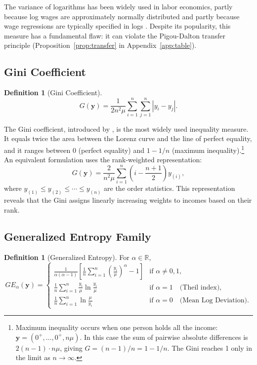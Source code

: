 \documentclass[12pt]{article}
\theoremstyle{plain}
\theoremstyle{definition}
\newtheorem{definition}[theorem]{Definition}
\theoremstyle{remark}
\newcommand{\R}{\mathbb{R}}
\newcommand{\bfy}{\mathbf{y}}
\begin{document}
The variance of logarithms has been widely used in labor economics, partly because log wages are approximately normally distributed and partly because wage regressions are typically specified in logs \citep{Juhn1993}.
Despite its popularity, this measure has a fundamental flaw: it can violate the Pigou-Dalton transfer principle (Proposition~\ref{prop:transfer} in Appendix~\ref{app:table}).

\subsection{Gini Coefficient}\label{sec:gini}

\begin{definition}[Gini Coefficient]
\begin{equation}\label{eq:gini}
G(\bfy) = \frac{1}{2n^2 \mu} \sum_{i=1}^n \sum_{j=1}^n |y_i - y_j|.
\end{equation}
\end{definition}

The Gini coefficient, introduced by \citet{Gini1912}, is the most widely used inequality measure.
It equals twice the area between the Lorenz curve and the line of perfect equality, and it ranges between 0 (perfect equality) and $1 - 1/n$ (maximum inequality).\footnote{Maximum inequality occurs when one person holds all the income: $\bfy = (0^+, \ldots, 0^+, n\mu)$. In this case the sum of pairwise absolute differences is $2(n-1) \cdot n\mu$, giving $G = (n-1)/n = 1 - 1/n$. The Gini reaches 1 only in the limit as $n \to \infty$.}
An equivalent formulation uses the rank-weighted representation:
\begin{equation}\label{eq:gini_rank}
G(\bfy) = \frac{2}{n^2 \mu} \sum_{i=1}^n \left(i - \frac{n+1}{2}\right) y_{(i)},
\end{equation}
where $y_{(1)} \leq y_{(2)} \leq \cdots \leq y_{(n)}$ are the order statistics.
This representation reveals that the Gini assigns linearly increasing weights to incomes based on their rank.

\subsection{Generalized Entropy Family}\label{sec:ge}

\begin{definition}[Generalized Entropy]
For $\alpha \in \R$,
\begin{equation}\label{eq:ge}
GE_\alpha(\bfy) = \begin{cases}
\displaystyle\frac{1}{\alpha(\alpha - 1)}\left[\frac{1}{n}\sum_{i=1}^n \left(\frac{y_i}{\mu}\right)^\alpha - 1\right] & \text{if } \alpha \neq 0, 1, \\[1.5em]
\displaystyle\frac{1}{n}\sum_{i=1}^n \frac{y_i}{\mu} \ln \frac{y_i}{\mu} & \text{if } \alpha = 1 \quad \text{(Theil index)}, \\[1.5em]
\displaystyle\frac{1}{n}\sum_{i=1}^n \ln \frac{\mu}{y_i} & \text{if } \alpha = 0 \quad \text{(Mean Log Deviation)}.
\end{cases}
\end{equation}
\end{definition}
\end{document}
